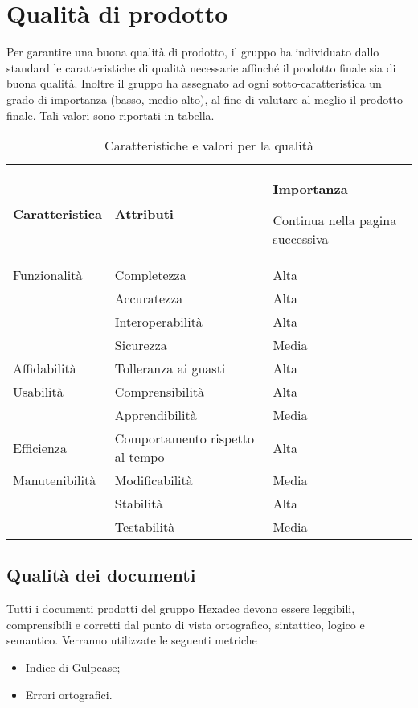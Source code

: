 \section{Qualità di prodotto}
Per garantire una buona qualità di prodotto, il gruppo ha individuato dallo standard 
 le caratteristiche di qualità necessarie affinché il prodotto finale sia di buona qualità. 
Inoltre il gruppo ha assegnato ad ogni sotto-caratteristica un grado di importanza (basso, medio alto), 
al fine di valutare al meglio il prodotto finale. Tali valori sono riportati in tabella.

\begin{center}
  \renewcommand{\arraystretch}{2}
   \begin{longtable}{m{3cm} m{6cm} m{3cm}}

       \rowcolor[HTML]{232f3e}

 \color[HTML]{FFFFFF}\textbf{Caratteristica} & \color[HTML]{FFFFFF}\textbf{Attributi} & \color[HTML]{FFFFFF}\textbf{Importanza} \

\endhead
     \rowcolor{white}\multicolumn{3}{c}
 { Continua nella pagina successiva} \\
 \endfoot

 \caption [Caratteristiche e valori per la qualità]{Caratteristiche e valori per la qualità}
   \label{tabella:qualProd}
 \endlastfoot

Funzionalità & Completezza & Alta\\
 & Accuratezza  & Alta\\
  & Interoperabilità & Alta\\
  & Sicurezza & Media\\
\rowcolor{tableRow}Affidabilità & Tolleranza ai guasti & Alta\\
Usabilità & Comprensibilità & Alta\\
 & Apprendibilità & Media\\
\rowcolor{tableRow}Efficienza & Comportamento rispetto al tempo & Alta\\
 Manutenibilità & Modificabilità & Media\\
               & Stabilità & Alta\\
                & Testabilità & Media\\


   \end{longtable}

\end{center}

    \subsection{Qualità dei documenti}
    Tutti i documenti prodotti del gruppo Hexadec devono essere leggibili, comprensibili e corretti dal punto di vista ortografico, sintattico, logico e semantico. Verranno utilizzate le seguenti metriche %
    \begin{itemize}
        \item Indice di Gulpease;
        \item Errori ortografici.
    \end{itemize}
    
